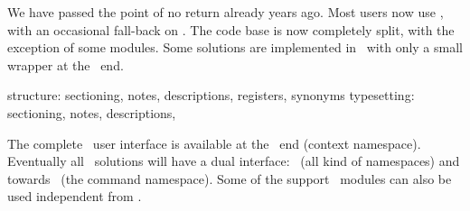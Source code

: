 \enablemode[print]


 {}

\startdocument
  [title=Finding\par the\par balance]


\startsubject[title={No way back}]

\StartSteps

\startitemize
\startitem We have passed the point of no return already years ago. \stopitem \FlushStep
\startitem Most users now use \MKIV, with an occasional fall-back on \MKII. \stopitem \FlushStep
\startitem The code base is now completely split, with the exception of some modules. \stopitem \FlushStep
\startitem Some solutions are implemented in \LUA\ with only a small wrapper at the \TEX\ end. \stopitem \FlushStep
\stopitemize

\StopSteps

\stopsubject

\startsubject[title={To get an idea}]

\StartSteps

\startitemize
\startitem structure: sectioning, notes, descriptions, registers, synonyms \stopitem \FlushStep
\startitem typesetting: sectioning, notes, descriptions, \stopitem \FlushStep
\stopitemize

\StopSteps

\stopsubject

\startsubject[title={Hybrid coding}]

\StartSteps

\startitemize
\startitem The complete \CONTEXT\ user interface is available at the \LUA\ end (context namespace). \stopitem \FlushStep
\startitem Eventually all \LUA\ solutions will have a dual interface: \LUA\ (all kind of namespaces) and
towards \TEX\ (the command namespace). \stopitem \FlushStep
\startitem Some of the support \LUA\ modules can also be used independent from \CONTEXT. \stopitem \FlushStep
\stopitemize

\StopSteps \StopPage

\startsubject[title={Coding in \TEX}]

\StartSteps

